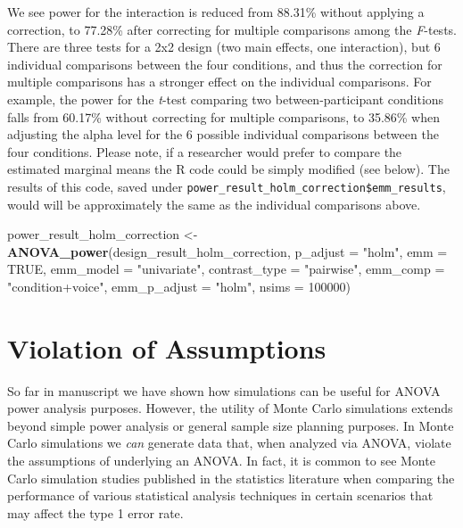 \documentclass[
  ,man,floatsintext]{apa6}
\newenvironment{Shaded}{\begin{snugshade}}{\end{snugshade}}
\newcommand{\DataTypeTok}[1]{\textcolor[rgb]{0.13,0.29,0.53}{#1}}
\newcommand{\DecValTok}[1]{\textcolor[rgb]{0.00,0.00,0.81}{#1}}
\newcommand{\KeywordTok}[1]{\textcolor[rgb]{0.13,0.29,0.53}{\textbf{#1}}}
\newcommand{\NormalTok}[1]{#1}
\newcommand{\OtherTok}[1]{\textcolor[rgb]{0.56,0.35,0.01}{#1}}
\newcommand{\StringTok}[1]{\textcolor[rgb]{0.31,0.60,0.02}{#1}}
\begin{document}
We see power for the interaction is reduced from 88.31\% without applying a correction, to 77.28\% after correcting for multiple comparisons among the \emph{F}-tests.
There are three tests for a 2x2 design (two main effects, one interaction), but 6 individual comparisons between the four conditions, and thus the correction for multiple comparisons has a stronger effect on the individual comparisons.
For example, the power for the \emph{t}-test comparing two between-participant conditions falls from 60.17\% without correcting for multiple comparisons, to 35.86\% when adjusting the alpha level for the 6 possible individual comparisons between the four conditions. Please note, if a researcher would prefer to compare the estimated marginal means the R code could be simply modified (see below). The results of this code, saved under \texttt{power\_result\_holm\_correction\$emm\_results}, would will be approximately the same as the individual comparisons above.

\begin{Shaded}
\begin{Highlighting}[]
\NormalTok{power_result_holm_correction <-}\StringTok{ }\KeywordTok{ANOVA_power}\NormalTok{(design_result_holm_correction,}
                                            \DataTypeTok{p_adjust =} \StringTok{"holm"}\NormalTok{,}
                                            \DataTypeTok{emm =} \OtherTok{TRUE}\NormalTok{,}
                                            \DataTypeTok{emm_model =} \StringTok{"univariate"}\NormalTok{,}
                                            \DataTypeTok{contrast_type =} \StringTok{"pairwise"}\NormalTok{,}
                                            \DataTypeTok{emm_comp =} \StringTok{"condition+voice"}\NormalTok{,}
                                            \DataTypeTok{emm_p_adjust =} \StringTok{"holm"}\NormalTok{,}
                                            \DataTypeTok{nsims =} \DecValTok{100000}\NormalTok{)}
\end{Highlighting}
\end{Shaded}

\hypertarget{violation-of-assumptions}{%
\section{Violation of Assumptions}\label{violation-of-assumptions}}

So far in manuscript we have shown how simulations can be useful for ANOVA power analysis purposes. However, the utility of Monte Carlo simulations extends beyond simple power analysis or general sample size planning purposes. In Monte Carlo simulations we \emph{can} generate data that, when analyzed via ANOVA, violate the assumptions of underlying an ANOVA. In fact, it is common to see Monte Carlo simulation studies published in the statistics literature when comparing the performance of various statistical analysis techniques in certain scenarios that may affect the type 1 error rate.
\end{document}
